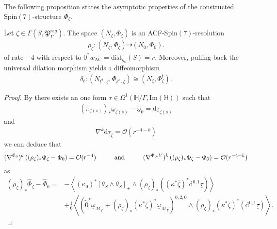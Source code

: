 \documentclass[psamsfonts]{amsart}
\theoremstyle{plain}
\theoremstyle{definition}{
\newtheorem{defi}{Definition}[section]
\newtheorem{ass}{Assumption}
\newtheorem*{nota}{Notation}}
\theoremstyle{remark}{
\newtheorem{rem}{Remark}
\newtheorem{ex}{Example}}
\theoremstyle{plain}{
\newtheorem{thm}{Theorem}[section]
\newtheorem{lem}{Lemma}[section]
\newtheorem{cor}{Corollary}[section]
\newtheorem{prop}{Proposition}[section]
\newtheorem{con}{Conjecture}[section]}
\newcommand{\m}[1]{{\mathrm{#1}}}
\newcommand{\und}[1]{\hspace{#1}\text{and}\hspace{#1}}
\begin{document}
The following proposition states the asymptotic properties of the constructed $\m{Spin}(7)$-structure $\Phi_\zeta$.

    
\begin{prop}
\label{ACFstructuresfrompullbacks4}
    Let $\zeta\in \Gamma(S,\mathfrak{P}^{reg}_\Gamma)$. The space $(N_\zeta,\Phi_\zeta)$ is an ACF-$\m{Spin}(7)$-resolution 
    \begin{align*}
        \rho_{\zeta}\colon (N_\zeta,\Phi_\zeta)\dashrightarrow(N_0,\Phi_0).
    \end{align*}
    of rate $-4$ with respect to $0^*w_{\m{AC}}=\m{dist}_{g_0}(S)=r$. Moreover, pulling back the universal dilation morphism yields a diffeomorphism 
    \begin{align*}
        \delta_t\colon(N_{t^2\cdot\zeta},\Phi_{t^2\cdot\zeta})\cong (N_\zeta,\Phi^t_\zeta).
    \end{align*}
\end{prop}

\begin{proof}
By \cite[Thm. 8.2.3]{joyce2000compact} there exists an one form $\tau\in\Omega^1(\mathbb{H}/\Gamma,\m{Im}(\mathbb{H}))$ such that 
\begin{align*}
    (\pi_{\zeta(s)})_*\underline{\omega}_{\zeta(s)}-\underline{\omega}_0=\m{d}\underline{\tau}_{\zeta(s)}
\end{align*}
and 
\begin{align*}
    \nabla^k\m{d}\underline{\tau}_\zeta=\mathcal{O}(r^{-4-k})
\end{align*}
we can deduce that 
\begin{align*}
    (\nabla^{\Phi_0})^k\left((\rho_\zeta)_*\Phi_\zeta-\Phi_0\right)=\mathcal{O}(r^{-4})\und{1.0cm}(\nabla^{\Phi_0,V})^k\left((\rho_\zeta)_*\Phi_\zeta-\Phi_0\right)=\mathcal{O}(r^{-4-k})
\end{align*}
as 
\begin{align*}
    (\rho_\zeta)_*\hat{\Phi}_\zeta-\hat{\Phi}_0=&-\left<(\kappa_0)^*\left[\theta_{S}\wedge\theta_S\right]_+\wedge(\rho_\zeta)_*((\kappa^*\overline{\zeta})^*\m{d}^{0,1}\underline{\tau})\right>\\
    &+\frac{1}{6}\left<\left(\tilde{0}^*\underline{\omega}_{\mathcal{M}_\Gamma}+(\rho_\zeta)_*(\kappa^*\overline{\zeta})^*\underline{\omega}_{\mathcal{M}_\Gamma}\right)^{0,2,0}\wedge(\rho_\zeta)_*(\kappa^*\overline{\zeta})^*(\m{d}^{0,1}\underline{\tau})\right>.
\end{align*}
\end{proof}
\end{document}
